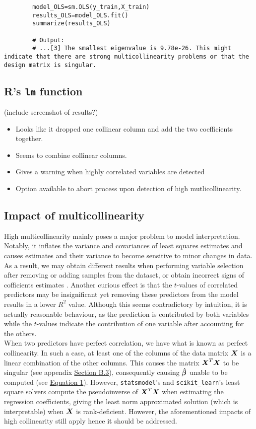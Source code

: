 \documentclass[12pt]{article}
\newcommand{\gbh}{\hat{\gb}}
\begin{document}
	\begin{lstlisting}
		model_OLS=sm.OLS(y_train,X_train)
		results_OLS=model_OLS.fit()
		summarize(results_OLS)
		
		# Output:
		# ...[3] The smallest eigenvalue is 9.78e-26. This might indicate that there are strong multicollinearity problems or that the design matrix is singular.
	\end{lstlisting}
	
	\subsection{R's \texttt{lm} function}
	(include screenshot of results?)
	
	\begin{itemize}
		\item Looks like it dropped one collinear column and add the two coefficients together.
		\item Seems to combine collinear columns.
		\item Gives a warning when highly correlated variables are detected
		\item Option available to abort process upon detection of high mutlicollinearity.
	\end{itemize}
	
	\subsection{Impact of multicollinearity}
	
	High multicollinearity mainly poses a major problem to model interpretation. Notably, it inflates the variance and covariances of least squares estimates and causes estimates and their variance to become sensitive to minor changes in data. As a result, we may obtain different results when performing variable selection after removing or adding samples from the dataset, or obtain incorrect signs of cofficients estimates \cite{McClave2018}. Another curious effect is that the $t$-values of correlated predictors may be insignificant yet removing these predictors from the model results in a lower $R^2$ value. Although this seems contradictory by intuition, it is actually reasonable behaviour, as the prediction is contributed by both variables while the $t$-values indicate the contribution of one variable after accounting for the others.\\
	
	When two predictors have perfect correlation, we have what is known as perfect collinearity. In such a case, at least one of the columns of the data matrix $\boldsymbol{X}$ is a linear combination of the other columns. This causes the matrix $\boldsymbol{X}^T\boldsymbol{X}$ to be singular (see appendix \hyperref[sec:append1]{Section B.3}), consequently causing $\boldsymbol{\gbh}$ unable to be computed (see \hyperref[eq1]{Equation 1}). However, \texttt{statsmodel}'s and \texttt{scikit\_learn}'s least square solvers compute the pseudoinverse of $\boldsymbol{X}^T\boldsymbol{X}$ when estimating the regression coefficients, giving the least norm approximated solution (which is interpretable) when $\boldsymbol{X}$ is rank-deficient. However, the aforementioned impacts of high collinearity still apply hence it should be addressed.\\
	
\end{document}
